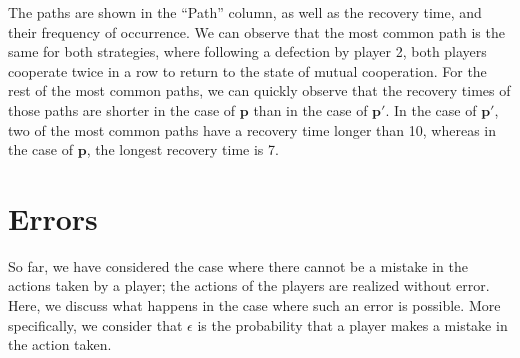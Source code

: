 \documentclass[11pt]{article}
\theoremstyle{plainCl1}
\theoremstyle{plainCl2}
\begin{document}
\begin{table}
{    The paths are shown in the ``Path'' column, as well as the recovery time, and their frequency of occurrence. We can observe that the most common path is the same for both strategies, where following a defection by player 2, both players cooperate twice in a row to return to the state of mutual cooperation. For the rest of the most common paths, we can quickly observe that the recovery times of those paths are shorter in the case of \(\mathbf{p}\) than in the case of \(\mathbf{p'}\).
    In the case of \(\mathbf{p'}\), two of the most common paths have a recovery time longer than 10, whereas in the case of \(\mathbf{p}\), the longest recovery time is 7.}
\end{table}


\clearpage

\section{Errors}

So far, we have considered the case where there cannot be a mistake in the
actions taken by a player; the actions of the players are realized without
error. Here, we discuss what happens in the case where such an error is
possible. More specifically, we consider that \(\epsilon\) is the probability
that a player makes a mistake in the action taken.
\end{document}
